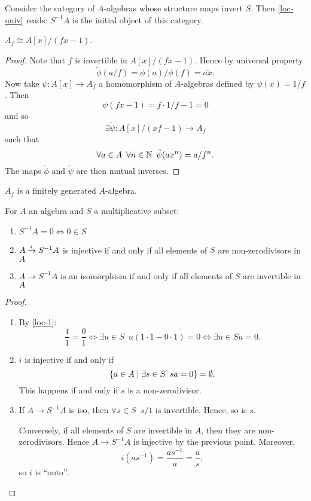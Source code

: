 \begin{corollary}
  Consider the category of $A$-algebras whose structure maps invert $S$. Then \cref{loc-univ} reads: $S^{-1}A$ is the initial object of this category.
\end{corollary}

\begin{lemma}
  \label{loc-1}
  $A_f \cong A[x] / {(fx-1)}$.
\end{lemma}

\begin{proof}
  Note that $f$ is invertible in $A[x] / {(fx-1)}$.
  Hence by universal property
  \[\tilde{\phi}(a / f) = \phi(a) / \phi(f) = \bar{ax}. \]
  Now take
  $\psi \colon A[x] \to A_f$ a homomorphism of $A$-algebras defined by $\psi(x) = 1 / f$.
  Then
  \[ \psi(fx - 1) = f \cdot 1 / f - 1 = 0 \]
  and so
  \[ \exists \tilde \psi \colon A[x] /{(xf-1)} \to A_f \]
  such that
  \[ \forall a \in A \enspace \forall n \in \mathbb N \enspace \tilde \psi (a x^n) = a / f^n.\]
  The maps $\tilde \phi$ and $\tilde \psi$ are then mutual inverses.
\end{proof}

\begin{corollary}
  $A_f$ is a finitely generated \(A\)-algebra.
\end{corollary}

\begin{lemma}
  For $A$ an algebra and $S$ a multiplicative subset:
  \begin{enumerate}
  \item $S^{-1}A = 0 \iff 0 \in S$
  \item $A \xrightarrow{i} S^{-1}A$ is injective if and only if all elements of $S$ are non-zerodivisors in $A$
  \item $A \to S^{-1}A$ is an isomorphism if and only if all elements of $S$ are invertible in $A$
  \end{enumerate}
\end{lemma}
\begin{proof}
  \begin{enumerate}
  \item By \cref{loc-1}:
    \[ \frac{1}{1} = \frac{0}{1} \iff \exists u \in S \enspace u(1 \cdot 1 - 0 \cdot 1 ) = 0 \iff \exists u \in S u = 0.\]
  \item $i$ is injective if and only if
    \[ \{a \in A \mathrel{|} \exists s \in S \enspace sa = 0 \} = \emptyset.\]
    This happens if and only if $s$ is a non-zerodivisor.
  \item If $A \to S^{-1}A$ is iso, then $\forall s \in S \enspace s/1 \text{ is invertible}$.
    Hence, so is $s$.

    Conversely, if all elements of $S$ are invertible in $A$, then they are non-zerodivisors. Hence $A \to S^{-1}A$ is injective by the previous point.
    Moreover,
    \[i (a s^{-1}) = \frac{a s^{-1}}{a} = \frac{a}{s},\]
    so $i$ is ``onto''.
  \end{enumerate}
\end{proof}

